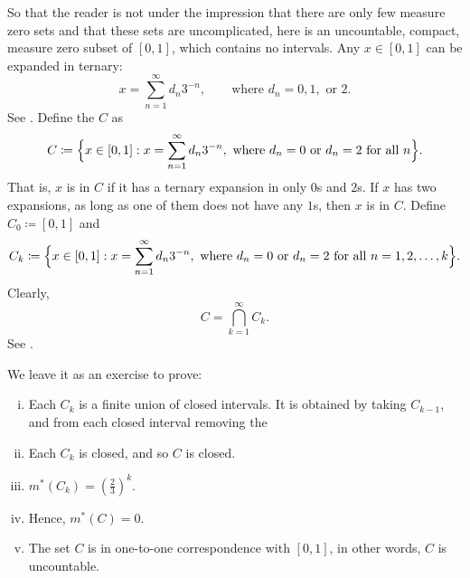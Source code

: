 \begin{example} \label{example:cantor}
So that the reader is not under the impression that there are only few
measure zero sets and that these sets are uncomplicated,
here is an uncountable, compact, measure zero subset of $[0,1]$, which
contains no intervals.
Any $x \in [0,1]$ can be expanded in ternary:
\begin{equation*}
x = \sum_{n=1}^\infty d_n 3^{-n} ,
\qquad \text{where } d_n=0, 1, \text{ or } 2.
\end{equation*}
See .
Define the \emph{} $C$ as
\begin{equation*}
C \coloneqq \Bigl\{ x \in [0,1] : x = \sum_{n=1}^\infty d_n 3^{-n},
\text{ where } d_n = 0 \text{ or } d_n = 2 \text{ for all } n \Bigr\} .
\end{equation*}
That is, $x$ is in $C$ if it has a ternary expansion in only $0$s and
$2$s.  If $x$ has two expansions, as long as one of them does not have any
$1$s, then $x$ is in $C$.
Define $C_0 \coloneqq [0,1]$ and
\begin{equation*}
C_k \coloneqq \Bigl\{ x \in [0,1] : x = \sum_{n=1}^\infty d_n 3^{-n},
\text{ where } d_n = 0 \text{ or } d_n = 2 \text{ for all } n=1,2,\ldots,k \Bigr\} .
\end{equation*}
Clearly,
\begin{equation*}
C = \bigcap_{k=1}^\infty C_k .
\end{equation*}
See .

We leave it as an exercise to prove:
\begin{enumerate}[(i)]
\item Each $C_k$ is a finite union of closed intervals.  It is obtained by
taking $C_{k-1}$, and from each closed interval removing the
\item Each $C_k$ is closed, and so $C$ is closed.
\item 
$m^*(C_k) = {\left(\frac{2}{3}\right)}^k$.
\item Hence,
$m^*(C) = 0$.
\item The set $C$ is in one-to-one correspondence with $[0,1]$, in other
words, $C$ is
uncountable.
\end{enumerate}
\begin{myfigureht}
\caption{Cantor set construction.\label{fig:cantor}}
\end{myfigureht}
\end{example}


